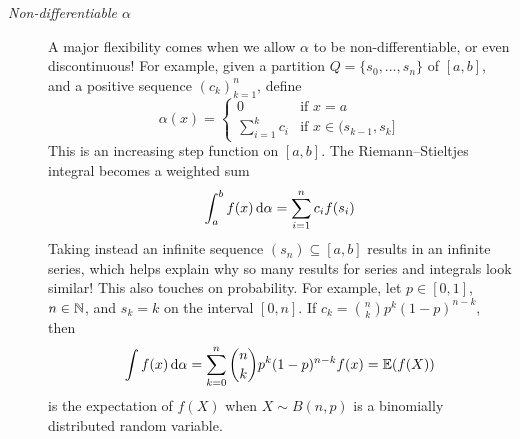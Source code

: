 \begin{description}
	\item[\normalfont\emph{Non-differentiable $\alpha$}] A major flexibility comes when we allow $\alpha$ to be non-differentiable, or even discontinuous! For example, given a partition $Q=\{s_0,\ldots,s_n\}$ of $[a,b]$, and a positive sequence $(c_k)_{k=1}^n$, define
  \[\alpha(x)=\begin{cases}
  0&\text{if }x=a\\
  \sum\limits_{i=1}^kc_i&\text{if }x\in (s_{k-1},s_{k}]
  \end{cases}\]
 	This is an increasing step function on $[a,b]$. The Riemann--Stieltjes integral becomes a weighted sum
  \[\int_a^bf(x)\,\mathrm{d}\alpha =\sum_{i=1}^nc_if(s_i)\]
  Taking instead an infinite sequence $(s_n)\subseteq[a,b]$ results in an infinite series, which helps explain why so many results for series and integrals look similar!\smallbreak
  This also touches on probability. For example, let $p\in[0,1]$, $n\in\mathbb{N}$, and $s_k=k$ on the interval $[0,n]$. If $c_k=\binom nkp^k(1-p)^{n-k}$, then
  \[\int f(x)\,\mathrm{d}\alpha =\sum_{k=0}^n\binom nkp^k(1-p)^{n-k} f(x)=\mathbb{E}(f(X))\]
  is the expectation of $f(X)$ when $X\sim B(n,p)$ is a binomially distributed random variable.
\end{description}

\goodbreak



